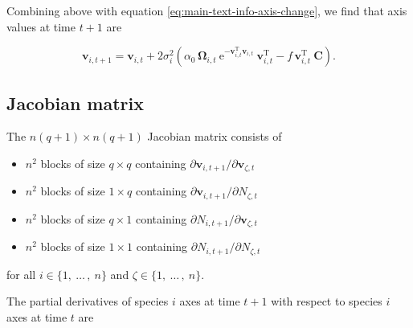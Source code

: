 Combining above with equation \ref{eq:main-text-info-axis-change}, we find that axis values at
time $t+1$ are

\begin{equation} \label{eq:supp-axis-change-full}
    \mathbf{v}_{i,t+1} = \mathbf{v}_{i,t} + 2 \sigma_i^2
    \left(
        \alpha_0 \, \bm{\Omega}_{i,t} \:
            \textrm{e}^{- \mathbf{v}_{i,t}^{\textrm{T}} \mathbf{v}_{i,t}} \:
            \mathbf{v}_{i,t}^{\textrm{T}}
        - f \, \mathbf{v}_{i,t}^{\textrm{T}} \: \mathbf{C}
    \right)
    \textrm{.}
\end{equation}


\subsection*{Jacobian matrix}

The $n(q+1) \times n(q+1)$ Jacobian matrix consists of 

\begin{itemize}
\item $n^2$ blocks of size $q \times q$ containing
    $\partial \mathbf{v}_{i,t+1} / \partial \mathbf{v}_{\zeta,t}$
\item $n^2$ blocks of size $1 \times q$ containing
    $\partial \mathbf{v}_{i,t+1} / \partial N_{\zeta,t}$
\item $n^2$ blocks of size $q \times 1$ containing
    $\partial N_{i,t+1} / \partial \mathbf{v}_{\zeta,t}$
\item $n^2$ blocks of size $1 \times 1$ containing
    $\partial N_{i,t+1} / \partial N_{\zeta,t}$
\end{itemize}


for all $i \in \{ 1, \: \ldots \, , \: n \}$
and $\zeta \in \{ 1, \: \ldots \, , \: n \}$.


The partial derivatives of species $i$ axes at time $t+1$ with respect
to species $i$ axes at time $t$ are

